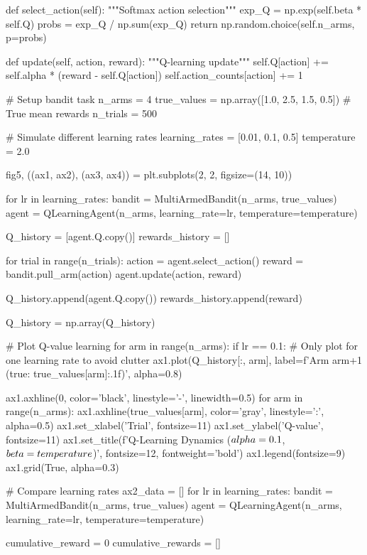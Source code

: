 \documentclass[a4paper, 11pt]{article}
\begin{document}
{{\begin{pycode}
    def select_action(self):
        """Softmax action selection"""
        exp_Q = np.exp(self.beta * self.Q)
        probs = exp_Q / np.sum(exp_Q)
        return np.random.choice(self.n_arms, p=probs)

    def update(self, action, reward):
        """Q-learning update"""
        self.Q[action] += self.alpha * (reward - self.Q[action])
        self.action_counts[action] += 1

# Setup bandit task
n_arms = 4
true_values = np.array([1.0, 2.5, 1.5, 0.5])  # True mean rewards
n_trials = 500

# Simulate different learning rates
learning_rates = [0.01, 0.1, 0.5]
temperature = 2.0

fig5, ((ax1, ax2), (ax3, ax4)) = plt.subplots(2, 2, figsize=(14, 10))

for lr in learning_rates:
    bandit = MultiArmedBandit(n_arms, true_values)
    agent = QLearningAgent(n_arms, learning_rate=lr, temperature=temperature)

    Q_history = [agent.Q.copy()]
    rewards_history = []

    for trial in range(n_trials):
        action = agent.select_action()
        reward = bandit.pull_arm(action)
        agent.update(action, reward)

        Q_history.append(agent.Q.copy())
        rewards_history.append(reward)

    Q_history = np.array(Q_history)

    # Plot Q-value learning
    for arm in range(n_arms):
        if lr == 0.1:  # Only plot for one learning rate to avoid clutter
            ax1.plot(Q_history[:, arm], label=f'Arm {arm+1} (true: {true_values[arm]:.1f})', alpha=0.8)

ax1.axhline(0, color='black', linestyle='-', linewidth=0.5)
for arm in range(n_arms):
    ax1.axhline(true_values[arm], color='gray', linestyle=':', alpha=0.5)
ax1.set_xlabel('Trial', fontsize=11)
ax1.set_ylabel('Q-value', fontsize=11)
ax1.set_title(f'Q-Learning Dynamics ($\\alpha={0.1}$, $\\beta={temperature}$)', fontsize=12, fontweight='bold')
ax1.legend(fontsize=9)
ax1.grid(True, alpha=0.3)

# Compare learning rates
ax2_data = []
for lr in learning_rates:
    bandit = MultiArmedBandit(n_arms, true_values)
    agent = QLearningAgent(n_arms, learning_rate=lr, temperature=temperature)

    cumulative_reward = 0
    cumulative_rewards = []


\end{pycode}}}
\end{document}
